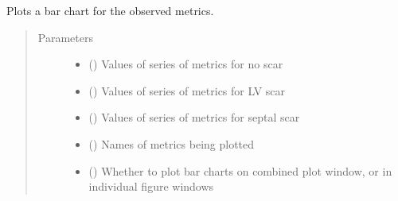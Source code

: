 \documentclass[letterpaper,10pt,english]{sphinxmanual}
\begin{document}
\begin{fulllineitems}
\label{\detokenize{_autosummary/signalplot.vcg.plot_metric_change_barplot:signalplot.vcg.plot_metric_change_barplot}}
\sphinxAtStartPar
Plots a bar chart for the observed metrics.
\begin{quote}\begin{description}
\item[{Parameters}] \leavevmode\begin{itemize}
\item {} 
\sphinxAtStartPar
{} () \textendash{} Values of series of metrics for no scar

\item {} 
\sphinxAtStartPar
{} () \textendash{} Values of series of metrics for LV scar

\item {} 
\sphinxAtStartPar
{} () \textendash{} Values of series of metrics for septal scar

\item {} 
\sphinxAtStartPar
{} () \textendash{} Names of metrics being plotted

\item {} 
\sphinxAtStartPar
{} (\sphinxstyleliteralemphasis{\sphinxupquote{, }}\sphinxstyleliteralemphasis{\sphinxupquote{, }}) \textendash{} Whether to plot bar charts on combined plot window, or in individual figure windows


\end{itemize}
\end{description}
\end{quote}
\end{fulllineitems}
\end{document}
